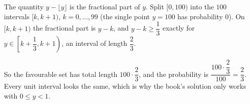 The quantity $y-\lfloor y\rfloor$ is the fractional part of $y$. Split $[0,100)$ into the $100$ intervals $[k,k+1)$, $k=0,\dots,99$ (the single point $y=100$ has probability $0$). On $[k,k+1)$ the fractional part is $y-k$, and $y-k\ge\dfrac{1}{3}$ exactly for $y\in\left[k+\dfrac{1}{3},k+1\right)$, an interval of length $\dfrac{2}{3}$.

So the favourable set has total length $100\cdot\dfrac{2}{3}$, and the probability is $\dfrac{100\cdot\dfrac{2}{3}}{100}=\boxed{\dfrac{2}{3}}$. Every unit interval looks the same, which is why the book's solution only works with $0\le y<1$.

